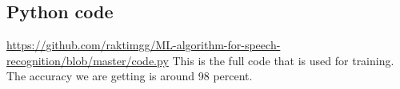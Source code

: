 \documentclass[journal,12pt,twocolumn]{IEEEtran}
\begin{document}
%
%
\subsection{Python code}

\url{https://github.com/raktimgg/ML-algorithm-for-speech-recognition/blob/master/code.py}\newline
This is the full code that is used for training. The accuracy we are getting is around 98 percent.
\end{document}
